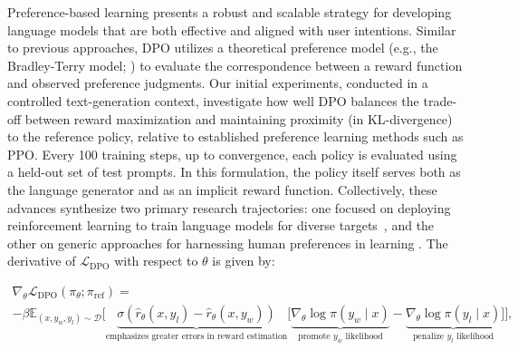 \begin{lemma}
Preference-based learning presents a robust and scalable strategy for developing language models that are both effective and aligned with user intentions. Similar to previous approaches, DPO utilizes a theoretical preference model (e.g., the Bradley-Terry model; \cite{bradley1952rankanalysis}) to evaluate the correspondence between a reward function and observed preference judgments. Our initial experiments, conducted in a controlled text-generation context, investigate how well DPO balances the trade-off between reward maximization and maintaining proximity (in KL-divergence) to the reference policy, relative to established preference learning methods such as PPO. Every 100 training steps, up to convergence, each policy is evaluated using a held-out set of test prompts. In this formulation, the policy itself serves both as the language generator and as an implicit reward function. Collectively, these advances synthesize two primary research trajectories: one focused on deploying reinforcement learning to train language models for diverse targets~\citep{Ranzato2015SequenceLT,paulus2018a,wu2018learning}, and the other on generic approaches for harnessing human preferences in learning \citep{christiano2017deep,kupcsik2018learning}. The derivative of $\mathcal{L}_\text{DPO}$ with respect to $\theta$ is given by:

\begin{multline*}\label{eq:gradient}
    \nabla_\theta \mathcal{L}_\text{DPO}(\pi_\theta;\pi_\text{ref}) = \\ -\beta\mathbb{E}_{(x, y_w, y_l) \sim \mathcal{D}} \bigg[\underbrace{\sigma(\hat{r}_\theta(x, y_l) - \hat{r}_\theta (x, y_w))}_\text{emphasizes greater errors in reward estimation}\bigg[\underbrace{\nabla_\theta\log \pi(y_w \mid x)}_\text{promote $y_w$ likelihood} - \underbrace{\nabla_\theta\log\pi(y_l \mid x)}_\text{penalize $y_l$ likelihood}\bigg]\bigg],
\end{multline*}


\end{lemma}
